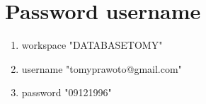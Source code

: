 \documentclass{article}
\begin{document}
\section{Password username}
      
      \begin{enumerate}
          \item workspace "DATABASETOMY"
          
          \item username "tomyprawoto@gmail.com"
          
          \item password "09121996"
      \end{enumerate}
      
       
\end{document}

